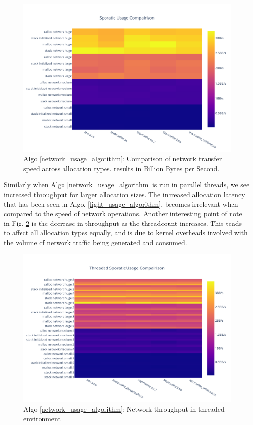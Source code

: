 \documentclass[letterpaper, 10 pt, conference]{ieeeconf}  %
\begin{document}
\begin{figure}[tbh!]
  \centering
  \includegraphics[width=\columnwidth]{graphs/sporatic_hist.png}
  \caption{ Algo \ref{network_usage_algorithm}: Comparison of network transfer speed across allocation types. results in Billion Bytes per Second. }
  \label{algo3_complete_hist}
\end{figure}

Similarly when Algo \ref{network_usage_algorithm} is run in parallel threads, we see increased throughput for larger allocation sizes.
The increased allocation latency that has been seen in Algo. \ref{light_usage_algorithm}, becomes irrelevant when compared to the speed of network operations.
Another interesting point of note in Fig. \ref{algo3_complete_threaded_hist} is the decrease in throughput as the threadcount increases.
This tends to affect all allocation types equally, and is due to kernel overheads involved with the volume of network traffic being generated and consumed.

\begin{figure}[tbh!]
  \centering
  \includegraphics[width=\columnwidth]{graphs/sporatic_threaded_hist.png}
  \caption{ Algo \ref{network_usage_algorithm}: Network throughput in threaded environment}
  \label{algo3_complete_threaded_hist}
\end{figure}
\end{document}
